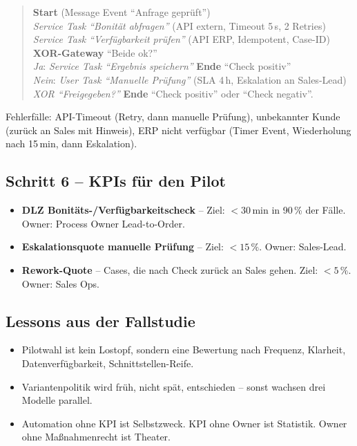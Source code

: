 \documentclass[11pt,a4paper,oneside]{article}
\newcommand{\fachbegriff}[1]{\textbf{#1}}
\begin{document}
\begin{quote}
\textbf{Start} (Message Event ``Anfrage geprüft'') \\
\textrightarrow{} \emph{Service Task ``Bonität abfragen''} (API extern, Timeout 5\,s, 2 Retries) \\
\textrightarrow{} \emph{Service Task ``Verfügbarkeit prüfen''} (API ERP, Idempotent, Case-ID) \\
\textrightarrow{} \textbf{XOR-Gateway} ``Beide ok?'' \\
\qquad \emph{Ja}: \textrightarrow{} \emph{Service Task ``Ergebnis speichern''} \textrightarrow{} \textbf{Ende} ``Check positiv'' \\
\qquad \emph{Nein}: \textrightarrow{} \emph{User Task ``Manuelle Prüfung''} (SLA 4\,h, Eskalation an Sales-Lead) \\
\qquad\quad \textrightarrow{} \emph{XOR ``Freigegeben?''} \textrightarrow{} \textbf{Ende} ``Check positiv'' oder ``Check negativ''.
\end{quote}

Fehlerfälle: API-Timeout (Retry, dann manuelle Prüfung), unbekannter Kunde (zurück an Sales mit Hinweis), ERP nicht verfügbar (Timer Event, Wiederholung nach 15\,min, dann Eskalation).

\subsection{Schritt 6 -- KPIs für den Pilot}

\begin{itemize}
  \item \fachbegriff{DLZ Bonitäts-/Verfügbarkeitscheck} -- Ziel: $<30\,\text{min}$ in 90\,\% der Fälle. Owner: Process Owner Lead-to-Order.
  \item \fachbegriff{Eskalationsquote manuelle Prüfung} -- Ziel: $<15\,\%$. Owner: Sales-Lead.
  \item \fachbegriff{Rework-Quote} -- Cases, die nach Check zurück an Sales gehen. Ziel: $<5\,\%$. Owner: Sales Ops.
\end{itemize}

\subsection{Lessons aus der Fallstudie}

\begin{itemize}
  \item Pilotwahl ist kein Lostopf, sondern eine Bewertung nach Frequenz, Klarheit, Datenverfügbarkeit, Schnittstellen-Reife.
  \item Variantenpolitik wird früh, nicht spät, entschieden -- sonst wachsen drei Modelle parallel.
  \item Automation ohne KPI ist Selbstzweck. KPI ohne Owner ist Statistik. Owner ohne Maßnahmenrecht ist Theater.
\end{itemize}
\end{document}
